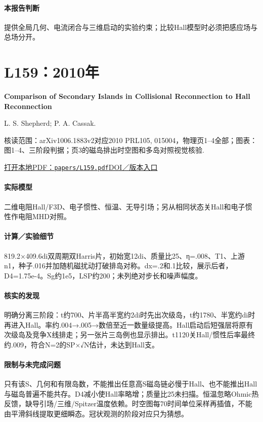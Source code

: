 \paragraph{本报告判断}提供全局几何、电流闭合与三维启动的实验约束；比较Hall模型时必须把感应场与总场分开。

\section{L159：2010年}\label{paper:L159}

\textbf{Comparison of Secondary Islands in Collisional Reconnection to Hall Reconnection}\citep{L159}\

L. S. Shepherd;  P. A. Cassak.

\textsf{核读范围：}arXiv1006.1883v2对应2010 PRL105, 015004，物理页1–4全部；\textsf{图表：}图1–4、三阶段判据；页3的磁岛排出时空图和多岛对照视觉核验.

\href{run:papers/L159.pdf}{打开本地PDF：\texttt{papers/L159.pdf}}\quad\href{https://doi.org/10.1103/physrevlett.105.015004}{DOI／版本入口}

\paragraph{实际模型}二维电阻Hall/F3D、电子惯性、恒温、无导引场；另从相同状态关Hall和电子惯性作电阻MHD对照。

\paragraph{计算／实验细节}819.2×409.6di双周期双Harris片，初始宽12di、质量比25、η=.008、T1、上游n1，种子.016并加随机磁扰动打破排岛对称。dx=.2和.1比较，展示后者，D4=1.75e-4。Sg约1e5，LSP约200；未列绝对步长和噪声幅度。

\paragraph{核实的发现}明确分离三阶段：t约700、片半高半宽约2di时先出次级岛，t约1780、半宽约di时再进入Hall。率约.004→.005→数倍至近一数量级提高。Hall启动后短强层将原有次级岛及竞争X线排走；另一张片三岛例也显示排出。t1120关Hall/惯性后率最终约.009，符合N=2的SP×√N估计，未达到Hall支。

\paragraph{限制与未完成问题}只有该S、几何和有限岛数，不能推出任意高S磁岛链必慢于Hall、也不能推出Hall与磁岛普遍不能共存。D4减小使Hall率略增；质量比25未扫描。恒温忽略Ohmic热反馈，缺导引场/三维/Spitzer温度依赖。时空图每70时间单位采样再插值，不能由平滑斜线提取更细瞬态。冠状观测的阶段对应只为猜想。

